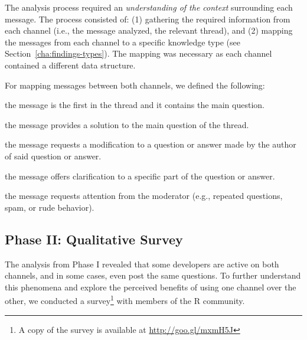 
The analysis process required an \textit{understanding of the context} surrounding each message. The process consisted of: (1) gathering the required information from each channel (i.e., the message analyzed, the relevant thread), and (2) mapping the messages from each channel to a specific knowledge type (see Section~\ref{cha:findings-types}). The mapping was necessary as each channel contained a different data structure.

For mapping messages between both channels, we defined the following:

	\begin{description}[itemsep=1pt, topsep=2pt, leftmargin=1em, parsep=0pt]
		\item[Question:] the message is the first in the thread and it contains the main question.
		\item[Answer:] the message provides a solution to the main question of the thread.
	 	\item[Update:] the message requests a modification to a question or answer made by the author of said question or answer.
		\item[Comment:] the message offers clarification to a specific part of the question or answer.
		\item[Flag:] the message requests attention from the moderator (e.g., repeated questions, spam, or rude behavior).
	\end{description}


\subsection{Phase II: Qualitative Survey}

The analysis from Phase I revealed that some developers are active on both channels, and in some cases, even post the same questions. To further understand this phenomena and explore the perceived benefits of using one channel over the other, we conducted a survey\footnote{A copy of the survey is available at \url{http://goo.gl/mxmH5J}} with members of the R community. %

